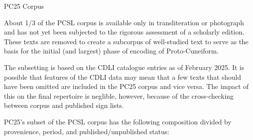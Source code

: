 	\centerline{\vbox{\offinterlineskip{}
}}\Hhhh{}PC25 Corpus


\par About 1/3 of the PCSL corpus is available only in
      transliteration or photograph and has not yet been subjected to
      the rigorous assessment of a scholarly edition. These texts are
      removed to create a subcorpus of well-studied text to serve as
      the basis for the initial (and largest) phase of encoding of
      Proto-Cuneiform.


\par The subsetting is based on the CDLI catalogue entries as of
      February 2025.  It is possible that features of the CDLI data
      may mean that a few texts that should have been omitted are
      included in the PC25 corpus and vice versa. The impact of this
      on the final repertoire is neglible, however, because of the
      cross-checking between corpus and published sign lists.


\par PC25's subset of the PCSL corpus has the following
      composition divided by provenience, period, and
      published/unpublished status:

\bigskip

